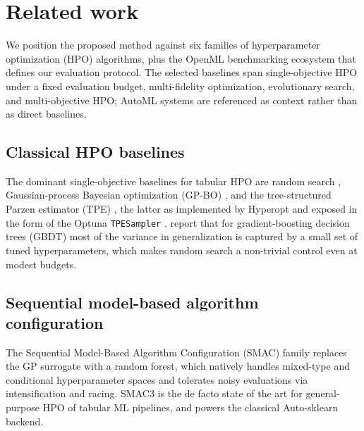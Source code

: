 \section{Related work}\label{sec:related-work}

We position the proposed method against six families of hyperparameter
optimization (HPO) algorithms, plus the OpenML benchmarking ecosystem
that defines our evaluation protocol. The selected baselines span
single-objective HPO under a fixed evaluation budget, multi-fidelity
optimization, evolutionary search, and multi-objective HPO; AutoML
systems are referenced as context rather than as direct baselines.

\subsection{Classical HPO baselines}\label{sec:rw-classical}
The dominant single-objective baselines for tabular HPO are random
search \citep{bergstra2012random}, Gaussian-process Bayesian
optimization (GP-BO) \citep{snoek2012bayesian,shahriari2016bayesian,
frazier2018tutorial}, and the tree-structured Parzen estimator (TPE)
\citep{bergstra2011tpe}, the latter as implemented by Hyperopt and
exposed in the form of the Optuna \texttt{TPESampler}
\citep{akiba2019optuna}. \citet{probst2019tunability} report that for
gradient-boosting decision trees (GBDT) most of the variance in
generalization is captured by a small set of tuned hyperparameters,
which makes random search a non-trivial control even at modest
budgets.

\subsection{Sequential model-based algorithm
configuration}\label{sec:rw-smac}
The Sequential Model-Based Algorithm Configuration (SMAC) family
\citep{hutter2011smac,lindauer2022smac3} replaces the GP surrogate
with a random forest, which natively handles mixed-type and
conditional hyperparameter spaces and tolerates noisy evaluations via
intensification and racing. SMAC3 is the de facto state of the art
for general-purpose HPO of tabular ML pipelines, and powers the
classical Auto-sklearn \citep{feurer2015autosklearn} backend.

